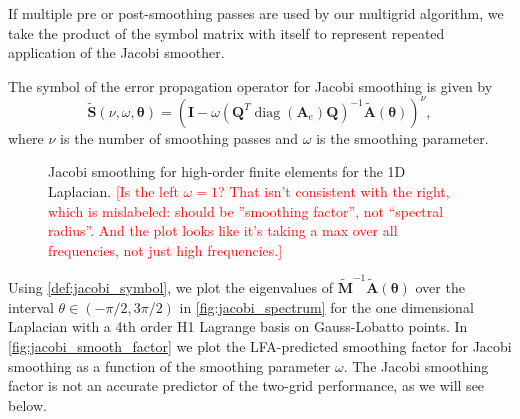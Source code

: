 \documentclass[review]{siamart190516}
\DeclareMathOperator{\diag}{diag}
\newcommand{\todo}[1]{\textcolor{red}{[#1]}}
\begin{document}
If multiple pre or post-smoothing passes are used by our multigrid algorithm, we take the product of the symbol matrix with itself to represent repeated application of the Jacobi smoother.

\begin{definition}\label{def:jacobi_symbol}
The symbol of the error propagation operator for Jacobi smoothing is given by
\begin{equation}
\tilde{\mathbf{S}} \left( \nu, \omega, \boldsymbol{\theta} \right) = \left( \mathbf{I} - \omega \left( \mathbf{Q}^T \diag \left( \mathbf{A}_e \right) \mathbf{Q} \right)^{-1} \tilde{\mathbf{A}} \left( \boldsymbol{\theta} \right) \right)^\nu,
\end{equation}
where $\nu$ is the number of smoothing passes and $\omega$ is the smoothing parameter.
\end{definition}

\begin{figure}[!tbp]
  \centering
  \hfill
  \caption{Jacobi smoothing for high-order finite elements for the 1D Laplacian. \todo{Is the left $\omega=1$? That isn't consistent with the right, which is mislabeled: should be ''smoothing factor'', not ``spectral radius''. And the plot looks like it's taking a max over all frequencies, not just high frequencies.}}
\end{figure}

Using \cref{def:jacobi_symbol}, we plot the eigenvalues of $\tilde{\mathbf{M}}^{-1} \tilde{\mathbf{A}} \left( \boldsymbol{\theta} \right)$ over the interval $\theta \in \left( - \pi / 2, 3 \pi / 2 \right)$ in \cref{fig:jacobi_spectrum} for the one dimensional Laplacian with a 4th order H1 Lagrange basis on Gauss-Lobatto points.
In \cref{fig:jacobi_smooth_factor} we plot the LFA-predicted smoothing factor for Jacobi smoothing as a function of the smoothing parameter $\omega$.
The Jacobi smoothing factor is not an accurate predictor of the two-grid performance, as we will see below.
\end{document}
